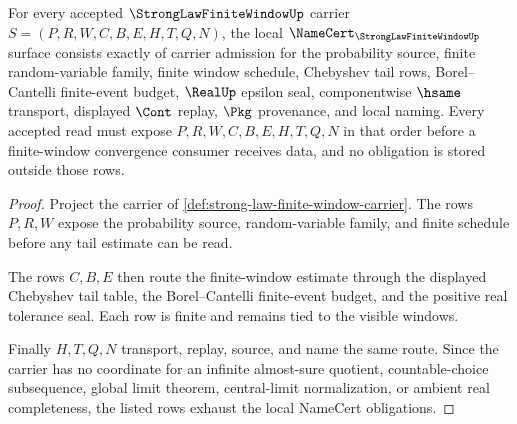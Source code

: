 \begin{theorem}\label{thm:strong-law-finite-window-namecert-obligations}
For every accepted $\StrongLawFiniteWindowUp$ carrier $S=(P,R,W,C,B,E,H,T,Q,N)$, the local $\NameCert_{\StrongLawFiniteWindowUp}$ surface consists exactly of carrier admission for the probability source, finite random-variable family, finite window schedule, Chebyshev tail rows, Borel--Cantelli finite-event budget, $\RealUp$ epsilon seal, componentwise $\hsame$ transport, displayed $\Cont$ replay, $\Pkg$ provenance, and local naming. Every accepted read must expose $P,R,W,C,B,E,H,T,Q,N$ in that order before a finite-window convergence consumer receives data, and no obligation is stored outside those rows.
\end{theorem}
\begin{proof}
Project the carrier of \autoref{def:strong-law-finite-window-carrier}. The rows $P,R,W$ expose the probability source, random-variable family, and finite schedule before any tail estimate can be read.

The rows $C,B,E$ then route the finite-window estimate through the displayed Chebyshev tail table, the Borel--Cantelli finite-event budget, and the positive real tolerance seal. Each row is finite and remains tied to the visible windows.

Finally $H,T,Q,N$ transport, replay, source, and name the same route. Since the carrier has no coordinate for an infinite almost-sure quotient, countable-choice subsequence, global limit theorem, central-limit normalization, or ambient real completeness, the listed rows exhaust the local NameCert obligations.
\end{proof}

